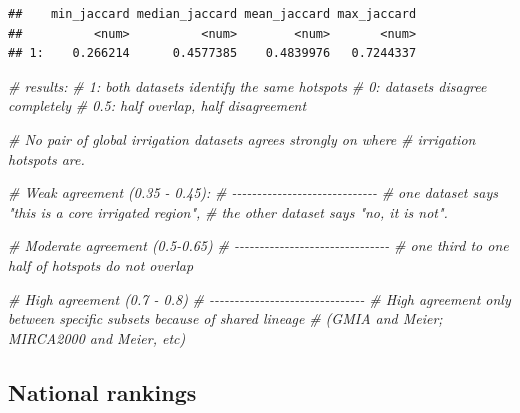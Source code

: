 \documentclass[
  11pt,
]{article}
\newenvironment{Shaded}{\begin{snugshade}}{\end{snugshade}}
\newcommand{\CommentTok}[1]{\textcolor[rgb]{0.56,0.35,0.01}{\textit{#1}}}
\begin{document}
\begin{verbatim}
##    min_jaccard median_jaccard mean_jaccard max_jaccard
##          <num>          <num>        <num>       <num>
## 1:    0.266214      0.4577385    0.4839976   0.7244337
\end{verbatim}

\begin{Shaded}
\begin{Highlighting}[]
\CommentTok{\# results:}
\CommentTok{\# 1: both datasets identify the same hotspots}
\CommentTok{\# 0: datasets disagree completely}
\CommentTok{\# 0.5: half overlap, half disagreement}

\CommentTok{\# No pair of global irrigation datasets agrees strongly on where}
\CommentTok{\# irrigation hotspots are.}

\CommentTok{\# Weak agreement (0.35 {-} 0.45):}
\CommentTok{\# {-}{-}{-}{-}{-}{-}{-}{-}{-}{-}{-}{-}{-}{-}{-}{-}{-}{-}{-}{-}{-}{-}{-}{-}{-}{-}{-}{-}{-}}
\CommentTok{\# one dataset says "this is a core irrigated region",}
\CommentTok{\# the other dataset says "no, it is not".}

\CommentTok{\# Moderate agreement (0.5{-}0.65)}
\CommentTok{\# {-}{-}{-}{-}{-}{-}{-}{-}{-}{-}{-}{-}{-}{-}{-}{-}{-}{-}{-}{-}{-}{-}{-}{-}{-}{-}{-}{-}{-}{-}{-}}
\CommentTok{\# one third to one half of hotspots do not overlap}

\CommentTok{\# High agreement (0.7 {-} 0.8)}
\CommentTok{\# {-}{-}{-}{-}{-}{-}{-}{-}{-}{-}{-}{-}{-}{-}{-}{-}{-}{-}{-}{-}{-}{-}{-}{-}{-}{-}{-}{-}{-}{-}{-}}
\CommentTok{\# High agreement only between specific subsets because of shared lineage }
\CommentTok{\# (GMIA and Meier; MIRCA2000 and Meier, etc)}
\end{Highlighting}
\end{Shaded}

\subsection{National rankings}\label{national-rankings}
\end{document}

